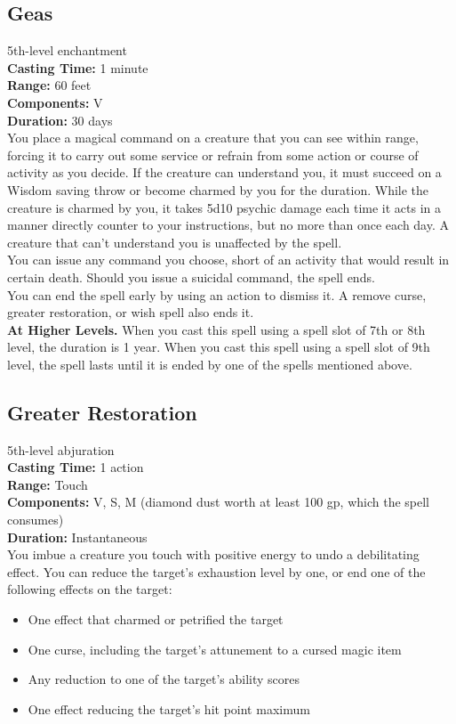 \documentclass[11pt, A4paper, english]{article}
\begin{document}
		\subsection{Geas}
5th-level enchantment \\
\textbf{Casting Time:} 1 minute \\
\textbf{Range:} 60 feet \\
\textbf{Components:} V \\
\textbf{Duration:} 30 days \\
You place a magical command on a creature that you can see within range, forcing it to carry out some service or refrain from some action or course of activity as you decide. If the creature can understand you, it must succeed on a Wisdom  saving throw or become charmed by you for the duration. While the creature is charmed by you, it takes 5d10 psychic damage each time it acts in a manner directly counter to your instructions, but no more than once each day. A creature that can't understand you is unaffected by the spell. \\
You can issue any command you choose, short of an activity that would result in certain death. Should you issue a suicidal command, the spell ends. \\
You can end the spell early by using an action to dismiss it. A remove curse, greater restoration, or wish spell also ends it. \\
\textbf{At Higher Levels.} When you cast this spell using a spell slot of 7th or 8th level, the duration is 1 year. When you cast this spell using a spell slot of 9th level, the spell lasts until it is ended by one of the spells mentioned above.

		\subsection{Greater Restoration}
5th-level abjuration \\
\textbf{Casting Time:} 1 action \\
\textbf{Range:} Touch \\
\textbf{Components:} V, S, M (diamond dust worth at least 100 gp, which the spell consumes) \\
\textbf{Duration:} Instantaneous \\
You imbue a creature you touch with positive energy to undo a debilitating effect. You can reduce the target’s exhaustion level by one, or end one of the following effects on the target:
			\begin{itemize}
\item One effect that charmed or petrified the target
\item One curse, including the target’s attunement to a cursed magic item
\item Any reduction to one of the target’s ability scores
\item One effect reducing the target’s hit point maximum
			\end{itemize}
\end{document}
